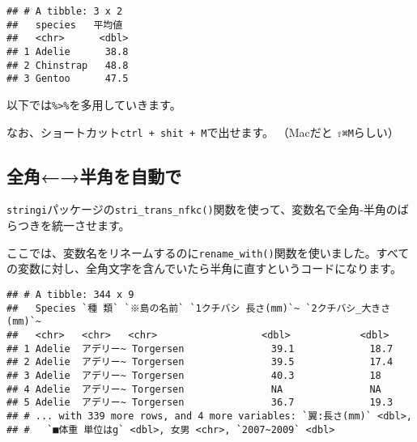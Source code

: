 \documentclass[
  xelatex,ja=standard, b5paper]{bxjsbook}
\newenvironment{Shaded}{\begin{snugshade}}{\end{snugshade}}
\newcommand{\KeywordTok}[1]{\textcolor[rgb]{0.13,0.29,0.53}{\textbf{#1}}}
\newcommand{\NormalTok}[1]{#1}
\newcommand{\OperatorTok}[1]{\textcolor[rgb]{0.81,0.36,0.00}{\textbf{#1}}}
\newcommand{\StringTok}[1]{\textcolor[rgb]{0.31,0.60,0.02}{#1}}
\begin{document}
\begin{verbatim}
## # A tibble: 3 x 2
##   species   平均値
##   <chr>      <dbl>
## 1 Adelie      38.8
## 2 Chinstrap   48.8
## 3 Gentoo      47.5
\end{verbatim}

以下では\texttt{\%\textgreater{}\%}を多用していきます。

なお、ショートカット\texttt{ctrl\ +\ shit\ +\ M}で出せます。
（Macだと \texttt{⇧⌘M}らしい）

\hypertarget{ux5168ux89d2ux534aux89d2ux3092ux81eaux52d5ux3067}{%
\subsection{全角←→半角を自動で}\label{ux5168ux89d2ux534aux89d2ux3092ux81eaux52d5ux3067}}

\texttt{stringi}パッケージの\texttt{stri\_trans\_nfkc()}関数を使って、変数名で全角-半角のばらつきを統一させます。

ここでは、変数名をリネームするのに\texttt{rename\_with()}関数を使いました。すべての変数に対し、全角文字を含んでいたら半角に直すというコードになります。

\begin{Shaded}
\end{Shaded}

\begin{verbatim}
## # A tibble: 344 x 9
##   Species `種 類` `※島の名前` `1クチバシ 長さ(mm)`~ `2クチバシ_大きさ(mm)`~
##   <chr>   <chr>   <chr>                  <dbl>            <dbl>
## 1 Adelie  アデリー~ Torgersen               39.1             18.7
## 2 Adelie  アデリー~ Torgersen               39.5             17.4
## 3 Adelie  アデリー~ Torgersen               40.3             18  
## 4 Adelie  アデリー~ Torgersen               NA               NA  
## 5 Adelie  アデリー~ Torgersen               36.7             19.3
## # ... with 339 more rows, and 4 more variables: `翼:長さ(mm)` <dbl>,
## #   `■体重 単位はg` <dbl>, 女男 <chr>, `2007~2009` <dbl>
\end{verbatim}
\end{document}
